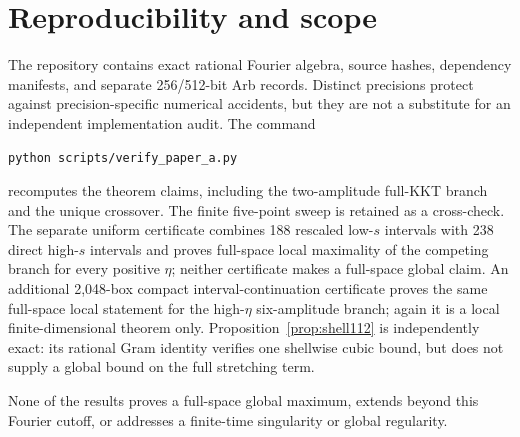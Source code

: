 \documentclass[11pt]{article}
\begin{document}
\section{Reproducibility and scope}
The repository contains exact rational Fourier algebra, source hashes,
dependency manifests, and separate 256/512-bit Arb records.  Distinct
precisions protect against precision-specific numerical accidents, but they
are not a substitute for an independent implementation audit.  The command
\begin{verbatim}
python scripts/verify_paper_a.py
\end{verbatim}
recomputes the theorem claims, including the two-amplitude full-KKT branch and
the unique crossover.  The finite five-point sweep is retained as a
cross-check. The separate uniform certificate combines 188 rescaled low-$s$
intervals with 238 direct high-$s$ intervals and proves full-space local
maximality of the competing branch for every positive $\eta$; neither
certificate makes a full-space global claim.
An additional 2,048-box compact interval-continuation certificate proves the
same full-space local statement for the high-$\eta$ six-amplitude branch;
again it is a local finite-dimensional theorem only.
Proposition~\ref{prop:shell112} is independently exact: its rational Gram
identity verifies one shellwise cubic bound, but does not supply a global
bound on the full stretching term.

None of the results proves a full-space global maximum, extends beyond this
Fourier cutoff, or addresses a finite-time singularity or global regularity.
\end{document}
